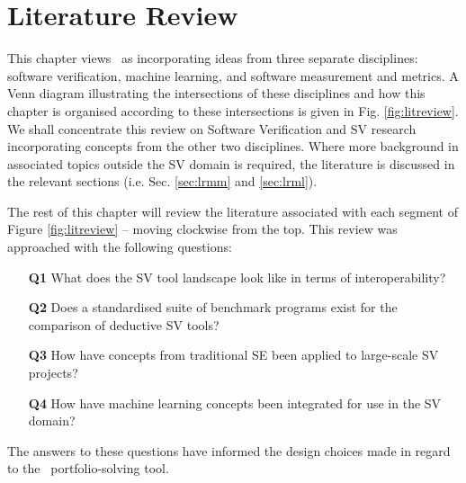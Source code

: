 \chapter{Literature Review}%
\thispagestyle{nohead}
\label{LitReview} %


This chapter views \where~as incorporating ideas from three separate disciplines: software verification, machine learning, and software measurement and metrics. 
A Venn diagram illustrating the intersections of these disciplines and how this chapter is organised according to these intersections is given in Fig. \ref{fig:litreview}. 
We shall concentrate this review on Software Verification and SV research incorporating concepts from the other two disciplines. 
Where more background in associated topics outside the SV domain is required, the literature is discussed in the relevant sections (i.e. Sec. \ref{sec:lrmm} and \ref{sec:lrml}).

The rest of this chapter will review the literature associated with each segment of Figure \ref{fig:litreview} -- moving clockwise from the top. 
This review was approached with the following questions:
\begin{itemize}
	\item[\textbf{Q1}] What does the SV tool landscape look like in terms of interoperability?
	\item[\textbf{Q2}] Does a standardised suite of benchmark programs exist for the comparison of deductive SV tools?
	\item[\textbf{Q3}] How have concepts from traditional SE been applied to large-scale SV projects?
	\item[\textbf{Q4}] How have machine learning concepts been integrated for use in the SV domain?
\end{itemize}
The answers to these questions have informed the design choices made in regard to the \where~portfolio-solving tool.

